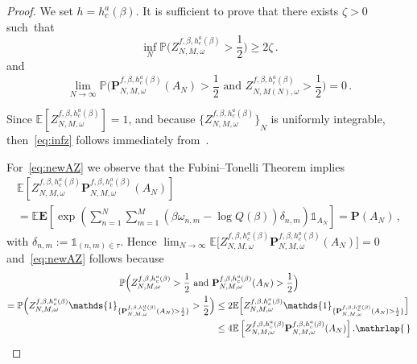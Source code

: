 \documentclass[10pt]{amsart}
\theoremstyle{definition}\newtheorem{defi}[theo]{Definition}\newtheorem{rema}[theo]{Remark}\newtheorem{exam}[theo]{Example}\newtheorem{exem}[theo]{Example}\newtheorem{nota}[theo]{Notation}
\newcommand{\gb}{\beta}
\newcommand{\unbf}%
{\mathds{1}}
\newcommand{\bP}{\ensuremath{\mathbf{P}}}
\newcommand{\bE}{\ensuremath{\mathbf{E}}}
\newcommand{\bbE}{\ensuremath{\mathbb{E}}}
\newcommand{\bbP}{\ensuremath{\mathbb{P}}}
\begin{document}
\begin{proof}
We set $h=h_c^{a}(\gb)$. It is sufficient to prove that there exists $\zeta>0$ such~that
\begin{equation}\label{eq:infz}
\inf_N \bbP \Big(Z^{f,\gb,h_c^{a}(\gb)}_{N,M,\omega} > \frac{1}{2} \Big) \ge 2\zeta\,.
\end{equation}
and
\begin{equation}\label{eq:newAZ}
\lim_{N \to \infty}
\bbP \Big(\bP^{f,\gb,h_c^{a}(\gb)}_{N,M,\omega} (A_N)>\frac{1}{2}
\text{ and } Z^{f,\gb,h_c^{a}(\gb)}_{N,M(N),\omega} > \frac{1}{2} \Big)=0\,.
\end{equation}

Since $ \bbE [Z^{f,\gb,h_c^{a}(\gb)}_{N,M,\omega}] = 1$, and because ${ \lbrace {Z^{f,\gb,h_c^{a}(\gb)}_{N,M,\omega}} \rbrace}_{N}$ is uniformly integrable, then~\eqref{eq:infz} follows immediately from~\cite[Lemma~4.6]{cf:G}.

For~\eqref{eq:newAZ} we observe that the Fubini--Tonelli Theorem implies
\begin{multline*}
\bbE \left[Z^{f,\gb,h_c^{a}(\gb)}_{N,M,\omega} \bP^{f,\gb,h_c^{a}(\gb)}_{N,M,\omega} (A_N) \right]\\
=\bbE \bE \left[\exp \left(\sum_{n=1}^N \sum_{m=1}^M (\beta \omega_{n,m} - \log Q(\beta)) \delta_{n,m} \right) \unbf_{ A_{N}} \right]=\bP(A_N)\,,
\end{multline*}
with $ \delta_{n,m} \!:=\! \unbf_{(n,m) \in \tau}$. Hence $\lim_{N\to\infty} \bbE \big[Z^{f,\gb,h_c^{a}(\gb)}_{N,M,\omega} \bP^{f,\gb,h_c^{a}(\gb)}_{N,M,\omega} (A_N) \big]\! =\! 0$ and~\eqref{eq:newAZ} follows because
\begin{multline}
\bbP \Big(Z^{f,\gb,h_c^{a}(\gb)}_{N,M,\omega}> \frac{1}{2} \text{ and } \bP^{f,\gb,h_c^{a}(\gb)}_{N,M,\omega} (A_N)> \frac{1}{2} \Big)\\
\begin{aligned}
=\bbP \Big(Z^{f,\gb,h_c^{a}(\gb)}_{N,M,\omega}\unbf_{ \{\bP^{f,\gb,h_c^{a}(\gb)}_{N,M,\omega} (A_N)> \frac{1}{2} \}}> \frac{1}{2} \Big)
&\le 2\bbE \Big[Z^{f,\gb,h_c^{a}(\gb)}_{N,M,\omega} \unbf_{ \{\bP^{f,\gb,h_c^{a}(\gb)}_{N,M,\omega} (A_N)> \frac{1}{2} \}} \Big]\: \\
&\le 4 \bbE \left[Z^{f,\gb,h_c^{a}(\gb)}_{N,M,\omega} \bP^{f,\gb,h_c^{a}(\gb)}_{N,M,\omega} (A_N) \right].\mathrlap{\,\qed}
\end{aligned}
\end{multline}
\let\qed\relax
\end{proof}
\end{document}
